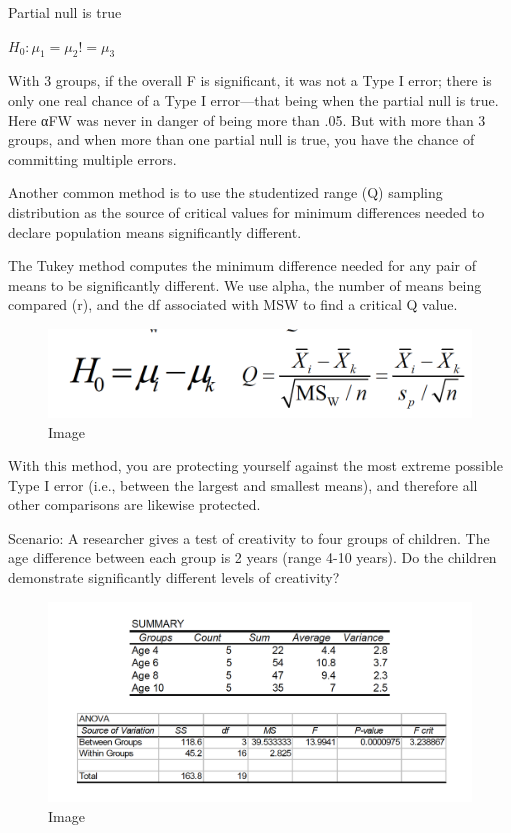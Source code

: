 \documentclass[]{book}
\theoremstyle{definition}
\theoremstyle{definition}
\theoremstyle{definition}
\theoremstyle{remark}
\begin{document}
Partial null is true

\(H_0 : \mu_1 = \mu_2 != \mu_3\)

With 3 groups, if the overall F is significant, it was not a Type I
error; there is only one real chance of a Type I error---that being when
the partial null is true. Here αFW was never in danger of being more
than .05. But with more than 3 groups, and when more than one partial
null is true, you have the chance of committing multiple errors.

Another common method is to use the studentized range (Q) sampling
distribution as the source of critical values for minimum differences
needed to declare population means significantly different.

The Tukey method computes the minimum difference needed for any pair of
means to be significantly different. We use alpha, the number of means
being compared (r), and the df associated with MSW to find a critical Q
value.

\begin{figure}
\centering
\includegraphics{img/hicksphc2.png}
\caption{Image}
\end{figure}

With this method, you are protecting yourself against the most extreme
possible Type I error (i.e., between the largest and smallest means),
and therefore all other comparisons are likewise protected.

Scenario: A researcher gives a test of creativity to four groups of
children. The age difference between each group is 2 years (range 4-10
years). Do the children demonstrate significantly different levels of
creativity?

\begin{figure}
\centering
\includegraphics{img/hicksphc3.png}
\caption{Image}
\end{figure}
\end{document}
